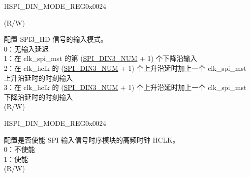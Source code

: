 \begin{register}{H}{SPI\_DIN\_MODE\_REG}{0x0024}
\begin{regdesc}
\begin{reglist}
(R/W)
\label{fielddesc:SPI3DIN3MODE}\item [SPI\_DIN3\_MODE] 配置 SPI3\_HD 信号的输入模式。\\
0：无输入延迟\\
1：在 clk\_spi\_mst 的第 (\hyperref[fielddesc:SPI3DIN3NUM]{SPI\_DIN3\_NUM} + 1) 个下降沿输入\\
2：在 clk\_hclk 的 (\hyperref[fielddesc:SPI3DIN3NUM]{SPI\_DIN3\_NUM} + 1) 个上升沿延时加上一个 clk\_spi\_mst 上升沿延时的时刻输入\\
3：在 clk\_hclk 的 (\hyperref[fielddesc:SPI3DIN3NUM]{SPI\_DIN3\_NUM} + 1) 个上升沿延时加上一个 clk\_spi\_mst 下降沿延时的时刻输入\\

(R/W)
\item [见下页]
\end{reglist}\end{regdesc}
\end{register}

\addtocounter{Regfloat}{-1}
\begin{register}{H}{SPI\_DIN\_MODE\_REG}{0x0024}
\begin{regdesc}\begin{reglist}
\item [接上页]
\label{fielddesc:SPI3TIMINGHCLKACTIVE}\item [SPI\_TIMING\_HCLK\_ACTIVE] 配置是否使能 SPI 输入信号时序模块的高频时钟 HCLK。\\
0：不使能\\
1：使能\\

(R/W)
\end{reglist}\end{regdesc}
\end{register}


